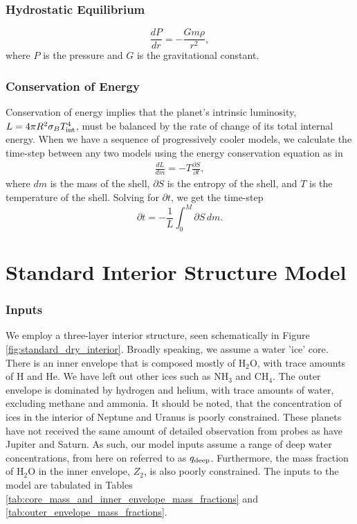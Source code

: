 \documentclass[11pt]{ucscthesisbs}
\begin{document}
\subsubsection{Hydrostatic Equilibrium}
\begin{equation}
  \frac{dP}{dr} = -\frac{Gm\rho}{r^{2}}  ,
\end{equation}
where $P$ is the pressure and $G$ is the gravitational constant. 
\subsubsection{Conservation of Energy}
Conservation of energy implies that the planet's intrinsic luminosity, $L = 4\pi R^2\sigma_{B}T_{\rm int}^4$, 
must be balanced by the rate of change of its total internal energy. When we have a sequence of progressively cooler models, we calculate the time-step between any two models using the energy conservation equation as in \citep{fortney_2011}
\begin{align}
\frac{dL}{dm}= -T\frac{\partial S}{\partial t},
\label{eq:energy_conservation}
\end{align}
where $dm$ is the mass of the shell, $\partial S$ is the entropy of the shell, and $T$ is the temperature of the shell. Solving for $\partial t$, we get the time-step
\begin{equation}
\partial t = -\frac{1}{L} \int_{0}^{M} \partial S \,dm .
\label{eq:timestep}
\end{equation}

\section{Standard Interior Structure Model}
\subsubsection{Inputs}
We employ a three-layer interior structure, seen schematically in Figure \ref{fig:standard_dry_interior}. Broadly speaking, we assume a water 'ice' core. There is an inner envelope that is composed mostly of H$_{2}$O, with trace amounts of H and He. We have left out other ices such as NH$_{3}$ and CH$_{4}$. The outer envelope is dominated by hydrogen and helium, with trace amounts of water, excluding methane and ammonia. It should be noted, that the concentration of ices in the interior of Neptune and Uranus is poorly constrained. These planets have not received the same amount of detailed observation from probes as have Jupiter and Saturn. As such, our model inputs assume a range of deep water concentrations, from here on referred to as $q_{\rm deep}$. Furthermore, the mass fraction of H$_{2}$O in the inner envelope, $Z_{2}$, is also poorly constrained. The inputs to the model are tabulated in Tables \ref{tab:core_mass_and_inner_envelope_mass_fractions} and \ref{tab:outer_envelope_mass_fractions}.
\end{document}
